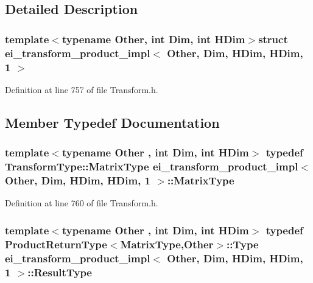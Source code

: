 \subsection{Detailed Description}
\subsubsection*{template$<$typename Other, int Dim, int H\-Dim$>$struct ei\-\_\-transform\-\_\-product\-\_\-impl$<$ Other, Dim, H\-Dim, H\-Dim, 1 $>$}



Definition at line 757 of file Transform.\-h.



\subsection{Member Typedef Documentation}
\hypertarget{structei__transform__product__impl_3_01_other_00_01_dim_00_01_h_dim_00_01_h_dim_00_011_01_4_ac7971ccd8b146d3dc210fdf19d8ebaee}{
\subsubsection[{Matrix\-Type}]{\setlength{\rightskip}{0pt plus 5cm}template$<$typename Other , int Dim, int H\-Dim$>$ typedef {\bf Transform\-Type\-::\-Matrix\-Type} {\bf ei\-\_\-transform\-\_\-product\-\_\-impl}$<$ Other, Dim, H\-Dim, H\-Dim, 1 $>$\-::{\bf Matrix\-Type}}}\label{structei__transform__product__impl_3_01_other_00_01_dim_00_01_h_dim_00_01_h_dim_00_011_01_4_ac7971ccd8b146d3dc210fdf19d8ebaee}


Definition at line 760 of file Transform.\-h.

\hypertarget{structei__transform__product__impl_3_01_other_00_01_dim_00_01_h_dim_00_01_h_dim_00_011_01_4_aa0c217289404a840ac600f05a886dbc3}{
\subsubsection[{Result\-Type}]{\setlength{\rightskip}{0pt plus 5cm}template$<$typename Other , int Dim, int H\-Dim$>$ typedef {\bf Product\-Return\-Type}$<${\bf Matrix\-Type},Other$>$\-::Type {\bf ei\-\_\-transform\-\_\-product\-\_\-impl}$<$ Other, Dim, H\-Dim, H\-Dim, 1 $>$\-::{\bf Result\-Type}}}\label{structei__transform__product__impl_3_01_other_00_01_dim_00_01_h_dim_00_01_h_dim_00_011_01_4_aa0c217289404a840ac600f05a886dbc3}


